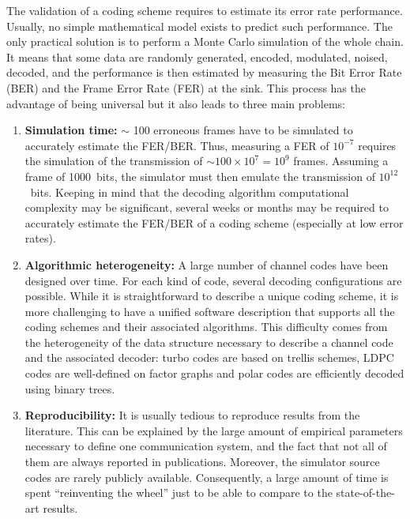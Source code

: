 The validation of a coding scheme requires to estimate its error rate
performance. Usually, no simple mathematical model exists to predict such
performance. The only practical solution is to perform a Monte Carlo simulation
of the whole chain. It means that some data are randomly generated, encoded,
modulated, noised, decoded, and the performance is then estimated by measuring
the Bit Error Rate (BER) and the Frame Error Rate (FER) at the sink. This
process has the advantage of being universal but it also leads to three main
problems:

\begin{enumerate}
  \item \textbf{Simulation time:}
    $\sim$ 100 erroneous frames have to be simulated to accurately estimate the
    FER/BER. Thus, measuring a FER of $10^{-7}$ requires the simulation of the
    transmission of $\sim100\times 10^7=10^9$ frames. Assuming a frame of
    1000~bits, the simulator must then emulate the transmission of
    $10^{12}$~bits. Keeping in mind that the decoding algorithm computational
    complexity may be significant, several weeks or months may be required to
    accurately estimate the FER/BER of a coding scheme (especially at low error
    rates).

  \item \textbf{Algorithmic heterogeneity:} A large number of channel codes have
    been designed over time. For each kind of code, several decoding
    configurations are possible. While it is straightforward to describe a
    unique coding scheme, it is more challenging to have a unified software
    description that supports all the coding schemes and their associated
    algorithms. This difficulty comes from the heterogeneity of the data
    structure necessary to describe a channel code and the associated decoder:
    turbo codes are based on trellis schemes, LDPC codes are well-defined on
    factor graphs and polar codes are efficiently decoded using binary trees.

  \item \textbf{Reproducibility:} It is usually tedious to reproduce results
    from the literature. This can be explained by the large amount of empirical
    parameters necessary to define one communication system, and the fact that
    not all of them are always reported in publications. Moreover, the simulator
    source codes are rarely publicly available. Consequently, a large amount of
    time is spent ``reinventing the wheel'' just to be able to compare to the
    state-of-the-art results.
\end{enumerate}

